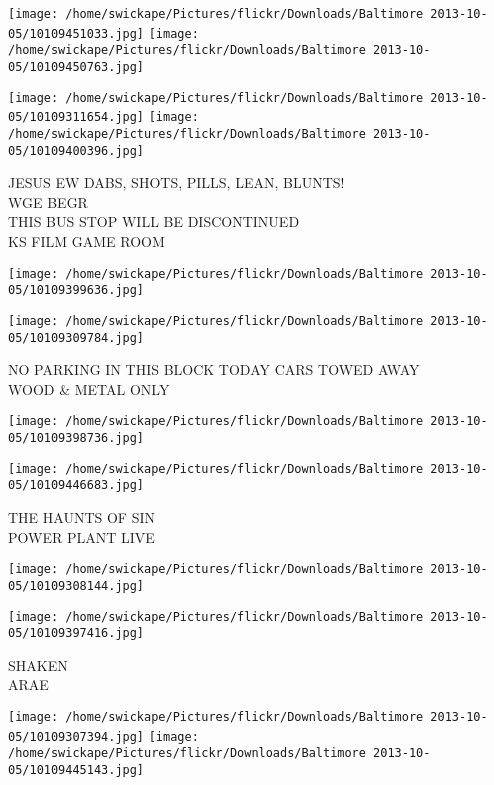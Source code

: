 \documentclass[10pt,letterpaper]{article}
\begin{document}
\texttt{[image: /home/swickape/Pictures/flickr/Downloads/Baltimore 2013-10-05/10109451033.jpg]}
\texttt{[image: /home/swickape/Pictures/flickr/Downloads/Baltimore 2013-10-05/10109450763.jpg]}

\texttt{[image: /home/swickape/Pictures/flickr/Downloads/Baltimore 2013-10-05/10109311654.jpg]}
\texttt{[image: /home/swickape/Pictures/flickr/Downloads/Baltimore 2013-10-05/10109400396.jpg]}

JESUS EW DABS, SHOTS, PILLS, LEAN, BLUNTS!\\
WGE BEGR\\
THIS BUS STOP WILL BE DISCONTINUED\\
KS FILM GAME ROOM\\
\pagebreak

\texttt{[image: /home/swickape/Pictures/flickr/Downloads/Baltimore 2013-10-05/10109399636.jpg]}

\vspace{0.25in}
\texttt{[image: /home/swickape/Pictures/flickr/Downloads/Baltimore 2013-10-05/10109309784.jpg]}

NO PARKING IN THIS BLOCK TODAY CARS TOWED AWAY\\
WOOD \& METAL ONLY\\
\pagebreak

\texttt{[image: /home/swickape/Pictures/flickr/Downloads/Baltimore 2013-10-05/10109398736.jpg]}

\vspace{0.25in}
\texttt{[image: /home/swickape/Pictures/flickr/Downloads/Baltimore 2013-10-05/10109446683.jpg]}

THE HAUNTS OF SIN\\
POWER PLANT LIVE\\
\pagebreak

\texttt{[image: /home/swickape/Pictures/flickr/Downloads/Baltimore 2013-10-05/10109308144.jpg]}

\vspace{0.25in}
\texttt{[image: /home/swickape/Pictures/flickr/Downloads/Baltimore 2013-10-05/10109397416.jpg]}

SHAKEN\\
ARAE\\
\pagebreak

\texttt{[image: /home/swickape/Pictures/flickr/Downloads/Baltimore 2013-10-05/10109307394.jpg]}
\texttt{[image: /home/swickape/Pictures/flickr/Downloads/Baltimore 2013-10-05/10109445143.jpg]}
\end{document}
